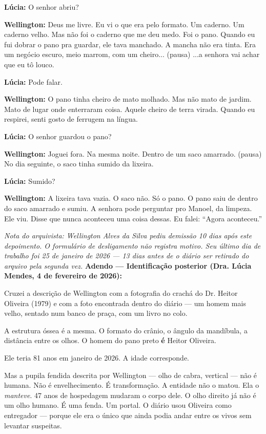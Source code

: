 \noindent \textbf{Lúcia:} O senhor abriu?

\noindent \textbf{Wellington:} Deus me livre. Eu vi o que era pelo formato. Um caderno. Um caderno velho. Mas não foi o caderno que me deu medo. Foi o pano. Quando eu fui dobrar o pano pra guardar, ele tava manchado. A mancha não era tinta. Era um negócio escuro, meio marrom, com um cheiro... (pausa) ...a senhora vai achar que eu tô louco.

\noindent \textbf{Lúcia:} Pode falar.

\noindent \textbf{Wellington:} O pano tinha cheiro de mato molhado. Mas não mato de jardim. Mato de lugar onde enterraram coisa. Aquele cheiro de terra virada. Quando eu respirei, senti gosto de ferrugem na língua.

\noindent \textbf{Lúcia:} O senhor guardou o pano?

\noindent \textbf{Wellington:} Joguei fora. Na mesma noite. Dentro de um saco amarrado. (pausa) No dia seguinte, o saco tinha sumido da lixeira.

\noindent \textbf{Lúcia:} Sumido?

\noindent \textbf{Wellington:} A lixeira tava vazia. O saco não. Só o pano. O pano saiu de dentro do saco amarrado e sumiu. A senhora pode perguntar pro Manoel, da limpeza. Ele viu. Disse que nunca aconteceu uma coisa dessas. Eu falei: \textquotedblleft{}Agora aconteceu.\textquotedblright{}

\noindent \textit{Nota do arquivista: Wellington Alves da Silva pediu demissão 10 dias após este depoimento. O formulário de desligamento não registra motivo. Seu último dia de trabalho foi 25 de janeiro de 2026 --- 13 dias antes de o diário ser retirado do arquivo pela segunda vez.}
\noindent \textbf{Adendo --- Identificação posterior (Dra. Lúcia Mendes, 4 de fevereiro de 2026):}

\noindent Cruzei a descrição de Wellington com a fotografia do crachá do Dr. Heitor Oliveira (1979) e com a foto encontrada dentro do diário --- um homem mais velho, sentado num banco de praça, com um livro no colo.

\noindent A estrutura óssea é a mesma. O formato do crânio, o ângulo da mandíbula, a distância entre os olhos. O homem do pano preto \textbf{é} Heitor Oliveira.

\noindent Ele teria 81 anos em janeiro de 2026. A idade corresponde.

\noindent Mas a pupila fendida descrita por Wellington --- olho de cabra, vertical --- não é humana. Não é envelhecimento. É transformação. A entidade não o matou. Ela o \textit{manteve}. 47 anos de hospedagem mudaram o corpo dele. O olho direito já não é um olho humano. É uma fenda. Um portal. O diário usou Oliveira como entregador --- porque ele era o único que ainda podia andar entre os vivos sem levantar suspeitas.

